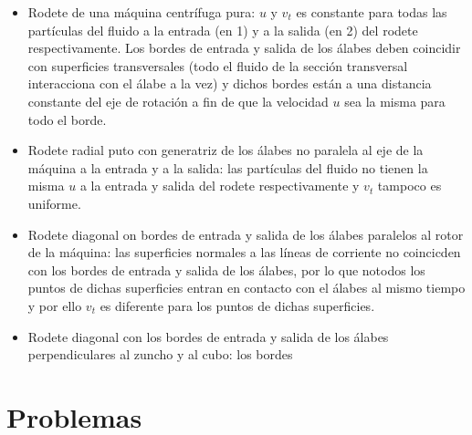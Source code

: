 \begin{itemize}
    \item Rodete de una máquina centrífuga pura: $u$ y $v_t$ es constante para todas las partículas del fluido a la entrada (en 1) y a la salida (en 2) del rodete respectivamente. Los bordes de entrada y salida de los álabes deben coincidir con superficies transversales (todo el fluido de la sección transversal interacciona con el álabe a la vez) y dichos bordes están a una distancia constante del eje de rotación a fin de que la velocidad $u$ sea la misma para todo el borde.
    \item Rodete radial puto con generatriz de los álabes no paralela al eje de la máquina a la entrada y a la salida: las partículas del fluido no tienen la misma $u$ a la entrada y salida del rodete respectivamente y $v_t$ tampoco es uniforme.
    \item Rodete diagonal on bordes de entrada y salida de los álabes paralelos al rotor de la máquina: las superficies normales a las líneas de corriente no coincicden con los bordes de entrada y salida de los álabes, por lo que notodos los puntos de dichas superficies entran en contacto con el álabes al mismo tiempo y por ello $v_t$ es diferente para los puntos de dichas superficies.
    \item Rodete diagonal con los bordes de entrada y salida de los álabes perpendiculares al zuncho y al cubo: los bordes
\end{itemize}

\section{Problemas}